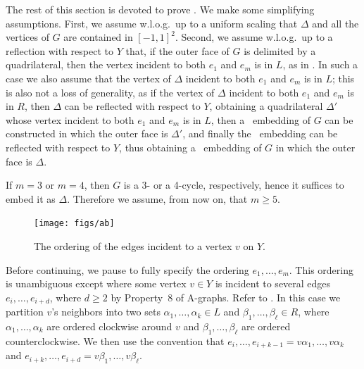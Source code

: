 The rest of this section is devoted to prove . We make some simplifying assumptions. First, we assume w.l.o.g.\ up to a uniform scaling that $\Delta$ and all the vertices of $G$ are contained in $[-1,1]^2$. Second, we assume w.l.o.g.\ up to a reflection  with respect to $Y$ that, if the outer face of $G$ is delimited by a quadrilateral, then the vertex incident to both $e_1$ and $e_m$ is in $L$, as in . In such a case we also assume that the vertex of $\Delta$ incident to both $e_1$ and $e_m$ is in $L$; this is also not a loss of generality, as if the vertex of $\Delta$ incident to both $e_1$ and $e_m$ is in $R$, then $\Delta$ can be reflected with respect to $Y$, obtaining a quadrilateral $\Delta'$ whose vertex incident to both $e_1$ and $e_m$ is in $L$, then a \Fary\ embedding of $G$ can be constructed in which the outer face is $\Delta'$, and finally the \Fary\ embedding can be reflected with respect to $Y$, thus obtaining a \Fary\ embedding of $G$ in which the outer face is $\Delta$. 

If $m=3$ or $m=4$, then $G$ is a 3- or a 4-cycle, respectively, hence it suffices to embed it as $\Delta$. Therefore we assume, from now on, that $m\ge 5$.  



	\begin{figure}
		\vspace{-1mm}
		\centering
		\texttt{[image: figs/ab]}
		\caption{The ordering of the edges incident to a vertex $v$ on $Y$.}
	\end{figure}
Before continuing, we pause to fully specify the ordering
$e_1,\ldots,e_m$. This ordering is unambiguous except where
some vertex $v\in Y$ is incident to several edges
$e_{i},\ldots,e_{i+d}$, where $d\ge 2$ by Property~8 of A-graphs. Refer to .  In this case we partition $v$'s neighbors into two
sets $\alpha_1,\ldots,\alpha_k\in L$ and $\beta_1,\ldots,\beta_\ell\in
R$, where $\alpha_1,\ldots,\alpha_k$ are ordered clockwise around $v$
and $\beta_1,\ldots,\beta_\ell$ are ordered counterclockwise.  We then use
the convention that $e_i,\ldots,e_{i+k-1}=v\alpha_1,\ldots,v\alpha_k$
and $e_{i+k},\ldots,e_{i+d}=v\beta_1,\ldots,v\beta_\ell$.

